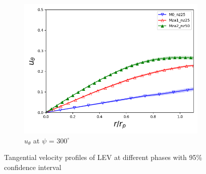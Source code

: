 \begin{figure}[H]
	\begin{subfigure}[b]{0.475\textwidth}
		\centering
		\includegraphics[width=1\textwidth]{figures/zonal_adapt_results/LEV_Re200k/u_theta/phase_300.png}
		\caption{ $u_\theta$ at $\psi$ = $300^\circ$}
		\label{fig:zonal_utheta_300_Re200k}
	\end{subfigure}
	\caption{Tangential velocity profiles of LEV at different phases with 95\% confidence interval}
	\label{fig:zonal_utheta_LEV_Re200k}
\end{figure}
